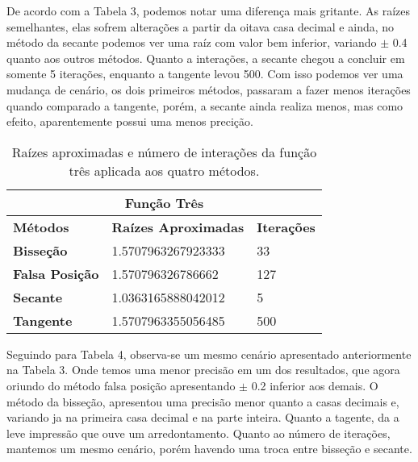 \documentclass[12pt]{article}
\begin{document}
De acordo com a Tabela 3, podemos notar uma diferença mais gritante. As raízes semelhantes, elas sofrem alterações a partir da oitava casa decimal e ainda, no método da secante podemos ver uma raíz com valor bem inferior, variando $\pm$ 0.4 quanto aos outros métodos. Quanto a interações, a secante chegou a concluir em somente 5 iterações, enquanto a tangente levou 500. Com isso podemos ver uma mudança de cenário, os dois primeiros métodos, passaram a fazer menos iterações quando comparado a tangente, porém, a secante ainda realiza menos, mas como efeito, aparentemente possui uma menos precição.
\begin{table}[!h]
\begin{center}
\begin{tabular}{lll}
\multicolumn{3}{c}{\textbf{Função Três}}                                                                            \\ \hline
\multicolumn{1}{l|}{\textbf{Métodos}}       & \multicolumn{1}{l|}{\textbf{Raízes Aproximadas}} & \textbf{Iterações} \\ \hline
\multicolumn{1}{l|}{\textbf{Bisseção}}      & \multicolumn{1}{l|}{1.5707963267923333}          & 33                 \\ \hline
\multicolumn{1}{l|}{\textbf{Falsa Posição}} & \multicolumn{1}{l|}{1.570796326786662}           & 127                \\ \hline
\multicolumn{1}{l|}{\textbf{Secante}}       & \multicolumn{1}{l|}{1.0363165888042012}          & 5                  \\ \hline
\multicolumn{1}{l|}{\textbf{Tangente}}      & \multicolumn{1}{l|}{1.5707963355056485}         & 500               
\end{tabular}
    \caption{Raízes aproximadas e número de interações da função três aplicada aos quatro métodos.}
\end{center}
\end{table}

Seguindo para Tabela 4, observa-se um mesmo cenário apresentado anteriormente na Tabela 3. Onde temos uma menor precisão em um dos resultados, que agora oriundo do método falsa posição apresentando $\pm$ 0.2 inferior aos demais. O método da bisseção, apresentou uma precisão menor quanto a casas decimais e, variando ja na primeira casa decimal e na parte inteira. Quanto a tagente, da a leve impressão que ouve um arredontamento. Quanto ao número de iterações, mantemos um mesmo cenário, porém havendo uma troca entre bisseção e secante.
\end{document}

